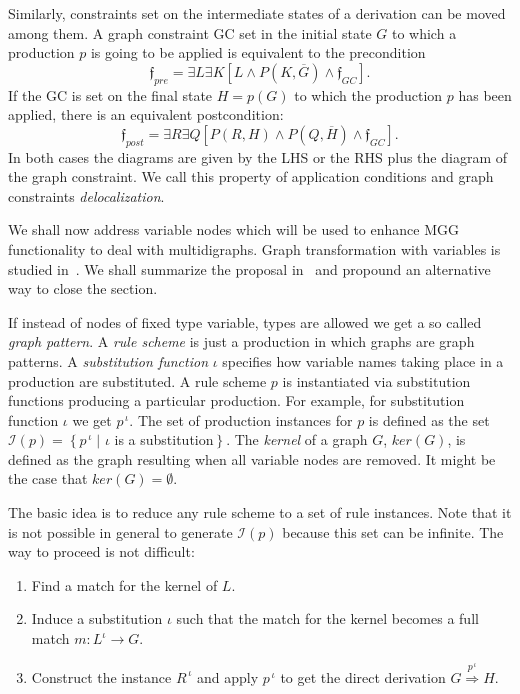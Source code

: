 \documentclass{fundam}
\begin{document}
Similarly, constraints set on the intermediate states of a derivation
can be moved among them. A graph constraint GC set in the initial
state $G$ to which a production $p$ is going to be applied is
equivalent to the precondition
\begin{equation}
  \label{eq:8}
  \mathfrak{f}_{pre} = \exists L \exists K \left[ L \wedge P\left( K,
      \overline{G} \right) \wedge \mathfrak{f}_{GC}\right].
\end{equation}
If the GC is set on the final state $ H = p(G)$ to which the
production $p$ has been applied, there is an equivalent postcondition:
\begin{equation}
  \label{eq:9}
  \mathfrak{f}_{post} = \exists R \exists Q \left[ P(R, H) \wedge P
    \left( Q, \overline{H} \right) \wedge \mathfrak{f}_{GC}\right].
\end{equation}
In both cases the diagrams are given by the LHS or the RHS plus the
diagram of the graph constraint. We call this property of application
conditions and graph constraints \emph{delocalization}.

We shall now address variable nodes which will be used to enhance MGG
functionality to deal with multidigraphs. Graph transformation with
variables is studied in~\cite{Hof05}. We shall summarize the proposal
in~\cite{Hof05} and propound an alternative way to close the section.

If instead of nodes of fixed type variable, types are allowed we get a
so called \emph{graph pattern}. A \emph{rule scheme} is just a
production in which graphs are graph patterns. A \emph{substitution
  function} $\iota$ specifies how variable names taking place in a
production are substituted.  A rule scheme $p$ is instantiated via
substitution functions producing a particular production. For example,
for substitution function $\iota$ we get $p^{\,\iota}$. The set of
production instances for $p$ is defined as the set $\mathcal{I}(p) =
\left\{ p^{\,\iota} \; \vert \right.$ $\iota$ is a
substitution$\left.\right\}$. The \emph{kernel} of a graph $G$,
$ker(G)$, is defined as the graph resulting when all variable nodes
are removed.  It might be the case that $ker(G) = \emptyset$.

The basic idea is to reduce any rule scheme to a set of rule
instances.  Note that it is not possible in general to generate
$\mathcal{I}(p)$ because this set can be infinite.  The way to proceed
is not difficult:
\begin{enumerate}
\item Find a match for the kernel of $L$.
\item Induce a substitution $\iota$ such that the match for the kernel
  becomes a full match $m:L^{\iota} \rightarrow G$.
\item Construct the instance $R^{\,\iota}$ and apply $p^{\,\iota}$ to
  get the direct derivation $G \stackrel{p^{\,\iota}}{\Longrightarrow}
  H$.
\end{enumerate}
\end{document}
